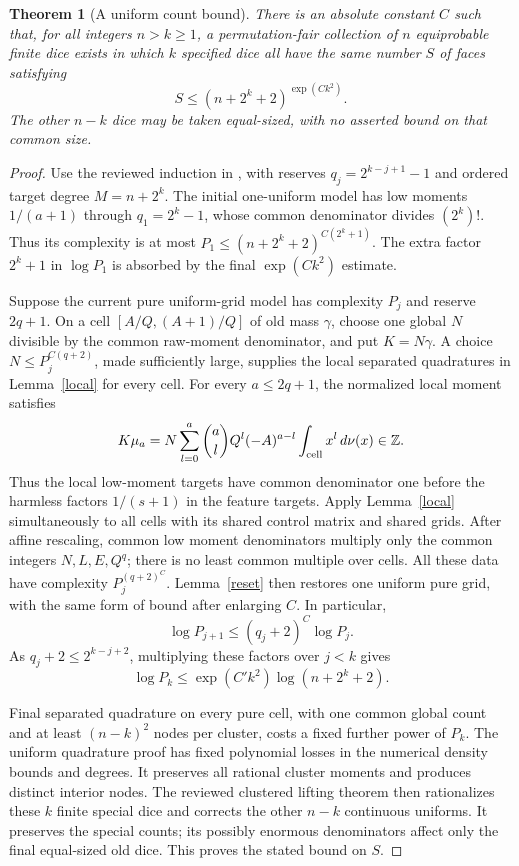 \documentclass[11pt]{article}
\newtheorem{theorem}{Theorem}\newtheorem{lemma}{Lemma}
\begin{document}
\begin{theorem}[A uniform count bound]\label{uniform}
There is an absolute constant $C$ such that, for all integers
$n>k\ge1$, a permutation-fair collection of $n$ equiprobable finite
dice exists in which $k$ specified dice all have the same number $S$
of faces satisfying
\[
 S\le (n+2^k+2)^{\exp(Ck^2)}.
\]
The other $n-k$ dice may be taken equal-sized, with no asserted bound
on that common size.
\end{theorem}
\begin{proof}
Use the reviewed induction in
,
with reserves
$q_j=2^{k-j+1}-1$ and ordered target degree $M=n+2^k$.
The initial one-uniform model has low moments $1/(a+1)$ through
$q_1=2^k-1$, whose common denominator divides $(2^k)!$. Thus its
complexity is at most
$P_1\le(n+2^k+2)^{C(2^k+1)}$.
The extra factor $2^k+1$ in $\log P_1$ is absorbed by the final
$\exp(Ck^2)$ estimate.

Suppose the current pure uniform-grid model has complexity $P_j$ and
reserve $2q+1$. On a cell $[A/Q,(A+1)/Q]$ of old mass $\gamma$,
choose one global $N$ divisible by the common raw-moment denominator,
and put $K=N\gamma$. A choice
$N\le P_j^{C(q+2)}$, made sufficiently large, supplies the local
separated quadratures in Lemma~\ref{local} for every cell.
For every $a\le2q+1$, the normalized local moment satisfies
\[
 K\mu_a=N\sum_{l=0}^a\binom alQ^l(-A)^{a-l}
          \int_{\rm cell} x^l\,d\nu(x)\in\mathbb Z.
\]
Thus the local low-moment targets have common denominator one before
the harmless factors $1/(s+1)$ in the feature targets.
Apply Lemma~\ref{local} simultaneously to all cells with its shared
control matrix and shared grids. After affine rescaling, common low
moment denominators multiply only the common integers $N,L,E,Q^q$;
there is no least common multiple over cells. All these data have
complexity $P_j^{(q+2)^C}$.
Lemma~\ref{reset} then restores one uniform pure grid, with the same
form of bound after enlarging $C$. In particular,
\[
 \log P_{j+1}\le(q_j+2)^C\log P_j.
\]
As $q_j+2\le2^{k-j+2}$, multiplying these factors over $j<k$ gives
\[
 \log P_k\le \exp(C'k^2)\log(n+2^k+2).
\]

Final separated quadrature on every pure cell, with one common global
count and at least $(n-k)^2$ nodes per cluster, costs a fixed further
power of $P_k$. The uniform quadrature proof has fixed polynomial
losses in the numerical density bounds and degrees. It preserves all
rational cluster moments and produces distinct interior nodes.
The reviewed clustered lifting theorem then rationalizes these $k$
finite special dice and corrects the other $n-k$ continuous uniforms.
It preserves the special counts; its possibly enormous denominators
affect only the final equal-sized old dice. This proves the stated
bound on $S$.
\end{proof}
\end{document}
